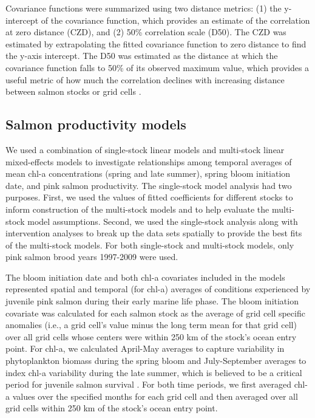 Covariance functions were summarized using two distance metrics: (1) the
y-intercept of the covariance function, which provides an estimate of the
correlation at zero distance (CZD), and (2) 50\% correlation scale (D50). The
CZD was estimated by extrapolating the fitted covariance function to zero
distance to find the y-axis intercept. The D50 was estimated as the distance at
which the covariance function falls to 50\% of its observed maximum value, which
provides a useful metric of how much the correlation declines with increasing
distance between salmon stocks or grid cells \citep{Mueter2002b}.


\subsection{Salmon productivity models}

We used a combination of single-stock linear models and multi-stock linear
mixed-effects models to investigate relationships among temporal averages of
mean chl-a concentrations (spring and late summer), spring bloom initiation
date, and pink salmon productivity. The single-stock model analysis had two
purposes. First, we used the values of fitted coefficients for different stocks
to inform construction of the multi-stock models and to help evaluate the
multi-stock model assumptions. Second, we used the single-stock analysis along
with intervention analyses to break up the data sets spatially to provide the
best fits of the multi-stock models. For both single-stock and multi-stock
models, only pink salmon brood years 1997-2009 were used.

The bloom initiation date and both chl-a covariates included in the models
represented spatial and temporal (for chl-a) averages of conditions experienced
by juvenile pink salmon during their early marine life phase. The bloom
initiation covariate was calculated for each salmon stock as the average of grid
cell specific anomalies (i.e., a grid cell's value minus the long term mean for
that grid cell) over all grid cells whose centers were within 250 km of the
stock's ocean entry point. For chl-a, we calculated April-May averages to
capture variability in phytoplankton biomass during the spring bloom and
July-September averages to index chl-a variability during the late summer, which
is believed to be a critical period for juvenile salmon survival
\citep{Beamish2001a, Moss2005a}. For both time periods, we first averaged chl-a
values over the specified months for each grid cell and then averaged over all
grid cells within 250 km of the stock's ocean entry point.


